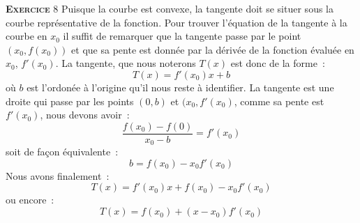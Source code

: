 \documentclass[10pt,a4paper,notitlepage]{article}
\newcommand{\exercice}[1]{\textsc{\textbf{Exercice}} #1}
\begin{document}
\bigskip

\exercice{8} Puisque la courbe est convexe, la tangente doit se situer
sous la courbe représentative de la fonction. Pour trouver l'équation
de la tangente à la courbe en $x_{0}$ il suffit de remarquer que la
tangente passe par le point $(x_{0}, f(x_{0}))$ et que sa pente est
donnée par la dérivée de la fonction évaluée en $x_{0}$, $f'(x_{0})$. La tangente, que nous noterons $T(x)$ est donc de la forme :
\[
T(x) = f'(x_{0}) x + b
\]
où $b$ est l'ordonée à l'origine qu'il nous reste à identifier. La
tangente est une droite qui passe par les points $(0,b)$ et
$(x_{0}, f'(x_{0})$, comme sa pente est $f'(x_{0})$, nous devons
avoir :
\[
\frac{f(x_{0})-f(0)}{x_{0}-b} = f'(x_{0})
\]
soit de façon équivalente :
\[
b = f(x_{0}) - x_{0}f'(x_{0})
\]
Nous avons finalement :
\[
T(x) = f'(x_{0}) x + f(x_{0}) - x_{0}f'(x_{0})
\]
ou encore :
\[
T(x) = f(x_{0}) + \left(x-x_{0}\right) f'(x_{0})
\]
\end{document}
